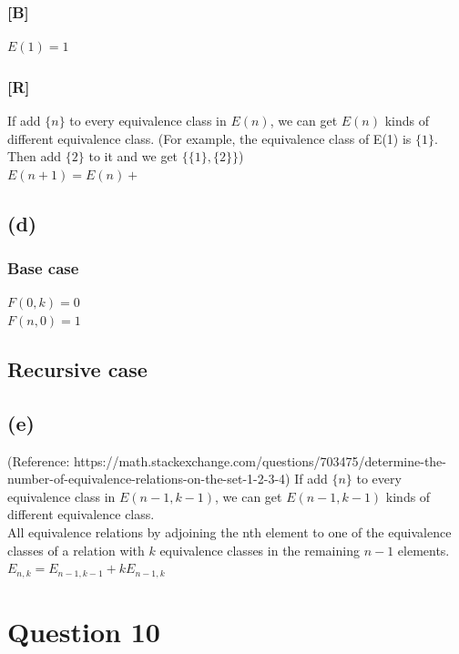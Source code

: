 \documentclass{article} %
\begin{document}
\subsubsection*{[B]}
$E(1) = 1$
\subsubsection*{[R]}
If add $\{n\}$ to every equivalence class in $E(n)$, we can get $E(n)$ kinds of different equivalence class. (For example, the equivalence class of E(1) is $\{{1}\}$. Then add $\{2\}$ to it and we get $\{\{1\},\{2\}\}$)\\
$E(n+1) = E(n)+$
\subsection*{(d)}
\subsubsection*{Base case}
$F(0,k) = 0$\\
$F(n,0) = 1$\\
\subsection*{Recursive case}

\subsection*{(e)}
(Reference: https://math.stackexchange.com/questions/703475/determine-the-number-of-equivalence-relations-on-the-set-1-2-3-4)
If add $\{n\}$ to every equivalence class in $E(n-1,k-1)$, we can get $E(n-1,k-1)$ kinds of different equivalence class.\\
All equivalence relations by adjoining the nth element to one of the equivalence classes of a relation with $k$ equivalence classes in the remaining $n -1$ elements.\\
$E_{n,k} = E_{n-1, k-1}+kE_{n-1,k}$
\section*{Question 10}
\end{document}
